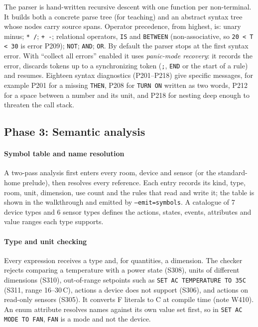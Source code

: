 \documentclass[conference]{IEEEtran}
\newcommand{\code}[1]{\texttt{#1}}
\newcommand{\degC}{\textdegree{}C}
\newcommand{\degF}{\textdegree{}F}
\begin{document}
The parser is hand-written recursive descent with one function per non-terminal. It builds both a concrete parse tree (for teaching) and an abstract syntax tree whose nodes carry source spans. Operator precedence, from highest, is: unary minus; \code{* /}; \code{+ -}; relational operators, \code{IS} and \code{BETWEEN} (non-associative, so \code{20 < T < 30} is error P209); \code{NOT}; \code{AND}; \code{OR}. By default the parser stops at the first syntax error. With ``collect all errors'' enabled it uses \emph{panic-mode recovery}: it records the error, discards tokens up to a synchronizing token (\code{;}, \code{END} or the start of a rule) and resumes. Eighteen syntax diagnostics (P201--P218) give specific messages, for example P201 for a missing \code{THEN}, P208 for \code{TURN ON} written as two words, P212 for a space between a number and its unit, and P218 for nesting deep enough to threaten the call stack.

\subsection{Phase 3: Semantic analysis}\label{sec:sem}
\paragraph{Symbol table and name resolution}
A two-pass analysis first enters every room, device and sensor (or the standard-home prelude), then resolves every reference. Each entry records its kind, type, room, unit, dimension, use count and the rules that read and write it; the table is shown in the walkthrough and emitted by \code{--emit=symbols}. A catalogue of 7 device types and 6 sensor types defines the actions, states, events, attributes and value ranges each type supports.

\paragraph{Type and unit checking}
Every expression receives a type and, for quantities, a dimension. The checker rejects comparing a temperature with a power state (S308), units of different dimensions (S310), out-of-range setpoints such as \code{SET AC TEMPERATURE TO 35C} (S311, range 16--30\,\degC), actions a device does not support (S306), and actions on read-only sensors (S305). It converts \degF{} literals to \degC{} at compile time (note W410). An enum attribute resolves names against its own value set first, so in \code{SET AC MODE TO FAN}, \code{FAN} is a mode and not the device.
\end{document}
